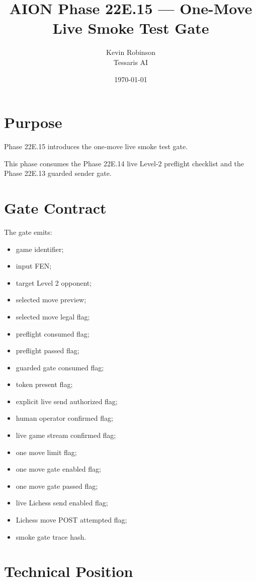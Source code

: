 \documentclass[11pt,a4paper]{article}
\title{\textbf{AION Phase 22E.15 --- One-Move Live Smoke Test Gate}}
\author{Kevin Robinson\\Tessaris AI}
\date{\today}
\begin{document}
\maketitle

\section{Purpose}

Phase 22E.15 introduces the one-move live smoke test gate.

This phase consumes the Phase 22E.14 live Level-2 preflight checklist and the Phase 22E.13 guarded sender gate.

\section{Gate Contract}

The gate emits:

\begin{itemize}[leftmargin=*]
  \item game identifier;
  \item input FEN;
  \item target Level 2 opponent;
  \item selected move preview;
  \item selected move legal flag;
  \item preflight consumed flag;
  \item preflight passed flag;
  \item guarded gate consumed flag;
  \item token present flag;
  \item explicit live send authorized flag;
  \item human operator confirmed flag;
  \item live game stream confirmed flag;
  \item one move limit flag;
  \item one move gate enabled flag;
  \item one move gate passed flag;
  \item live Lichess send enabled flag;
  \item Lichess move POST attempted flag;
  \item smoke gate trace hash.
\end{itemize}

\section{Technical Position}
\end{document}
